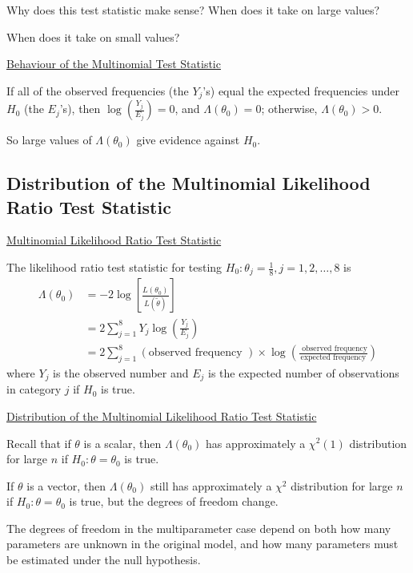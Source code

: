 Why does this test statistic make sense? When does it take on large values?

When does it take on small values?

\underline{Behaviour of the Multinomial Test Statistic}

If all of the observed frequencies (the $Y_{j}$'s) equal the expected frequencies
under $H_{0}$ (the $E_{j}$'s), then $\log \left(\frac{Y_{j}}{E_{j}}\right)=0$,
and $\Lambda\left(\theta_{0}\right)=0 $; otherwise, $ \Lambda\left(\theta_{0}\right)>0$.

So large values of $\Lambda\left(\theta_{0}\right)$ give evidence against $H_{0}$.

\subsection{Distribution of the Multinomial Likelihood Ratio Test Statistic}
\underline{Multinomial Likelihood Ratio Test Statistic}

The likelihood ratio test statistic for testing $H_{0}: \theta_{j}=\frac{1}{8}, j=1,2, \ldots, 8$ is
\[
    \begin{aligned}
        \Lambda\left(\theta_{0}\right) & =-2 \log \left[\frac{L\left(\theta_{0}\right)}{L(\tilde{\theta})}\right]                          \\
                                       & =2 \sum_{j=1}^{8} Y_{j} \log \left(\frac{Y_{j}}{E_{j}}\right)                                     \\
                                       & =2 \sum_{j=1}^{8}(\text{observed frequency }) \times \log \left(\frac{\text{ observed frequency}}
        {\text{expected frequency}}\right)
    \end{aligned}
\]
where $Y_{j}$ is the observed number and $E_{j}$ is the expected number of observations
in category $j$ if $H_{0}$ is true.

\underline{Distribution of the Multinomial Likelihood Ratio Test Statistic}

Recall that if $\theta$ is a scalar, then $\Lambda\left(\theta_{0}\right)$ has approximately
a $\chi^{2}(1)$ distribution for large $n$ if $H_{0}: \theta=\theta_{0}$ is true.

If $\theta$ is a vector, then $\Lambda\left(\theta_{0}\right)$ still has approximately a $\chi^{2}$
distribution for large $n$ if $H_{0}: \theta=\theta_{0}$ is true, but the degrees of freedom change.

The degrees of freedom in the multiparameter case depend on both how many parameters are unknown in
the original model, and how many parameters must be estimated under the null hypothesis.


